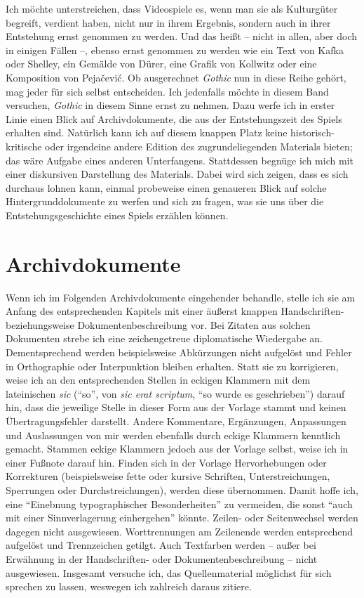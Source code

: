 \documentclass[a5paper,pagesize,numbers=noenddot]{scrbook}
\begin{document}
Ich möchte unterstreichen, dass Videospiele es, wenn man sie als Kulturgüter begreift, verdient haben, nicht nur in ihrem Ergebnis, sondern auch in ihrer Entstehung ernst genommen zu werden.
Und das heißt -- nicht in allen, aber doch in einigen Fällen --, ebenso ernst genommen zu werden wie ein Text von Kafka oder Shelley, ein Gemälde von Dürer, eine Grafik von Kollwitz oder eine Komposition von Pejačević.
Ob ausgerechnet \textit{Gothic} nun in diese Reihe gehört, mag jeder für sich selbst entscheiden.
Ich jedenfalls möchte in diesem Band versuchen, \textit{Gothic} in diesem Sinne ernst zu nehmen.
Dazu werfe ich in erster Linie einen Blick auf Archivdokumente, die aus der Entstehungszeit des Spiels erhalten sind.
Natürlich kann ich auf diesem knappen Platz keine historisch-kritische oder irgendeine andere Edition des zugrundeliegenden Materials bieten; das wäre Aufgabe eines anderen Unterfangens.
Stattdessen begnüge ich mich mit einer diskursiven Darstellung des Materials.
Dabei wird sich zeigen, dass es sich durchaus lohnen kann, einmal probeweise einen genaueren Blick auf solche Hintergrunddokumente zu werfen und sich zu fragen, was sie uns über die Entstehungsgeschichte eines Spiels erzählen können.


\section{Archivdokumente}\label{ch:quellen_archivdokumente}
Wenn ich im Folgenden Archivdokumente eingehender behandle, stelle ich sie am Anfang des entsprechenden Kapitels mit einer äußerst knappen Handschriften- beziehungsweise Dokumentenbeschreibung vor.
Bei Zitaten aus solchen Dokumenten strebe ich eine zeichengetreue diplomatische Wiedergabe an.
Dementsprechend werden beispielsweise Abkürzungen nicht aufgelöst und Fehler in Orthographie oder Interpunktion bleiben erhalten.
Statt sie zu korrigieren, weise ich an den entsprechenden Stellen in eckigen Klammern mit dem lateinischen \textit{sic} (\enquote{so}, von \textit{sic erat scriptum}, \enquote{so wurde es geschrieben}) darauf hin, dass die jeweilige Stelle in dieser Form aus der Vorlage stammt und keinen Übertragungsfehler darstellt.
Andere Kommentare, Ergänzungen, Anpassungen und Auslassungen von mir werden ebenfalls durch eckige Klammern kenntlich gemacht.
Stammen eckige Klammern jedoch aus der Vorlage selbst, weise ich in einer Fußnote darauf hin.
Finden sich in der Vorlage Hervorhebungen oder Korrekturen (beispielsweise fette oder kursive Schriften, Unterstreichungen, Sperrungen oder Durchstreichungen), werden diese übernommen.
Damit hoffe ich, eine \enquote{Einebnung typographischer Besonderheiten} zu vermeiden, die sonst \enquote{auch mit einer Sinnverlagerung einhergehen} könnte.\autocite[S.~21]{plachta_editionswissenschaft_1997}
Zeilen- oder Seitenwechsel werden dagegen nicht ausgewiesen.
Worttrennungen am Zeilenende werden entsprechend aufgelöst und Trennzeichen getilgt.
Auch Textfarben werden -- außer bei Erwähnung in der Handschriften- oder Dokumentenbeschreibung -- nicht ausgewiesen.
Insgesamt versuche ich, das Quellenmaterial möglichst für sich sprechen zu lassen, weswegen ich zahlreich daraus zitiere.
\end{document}
